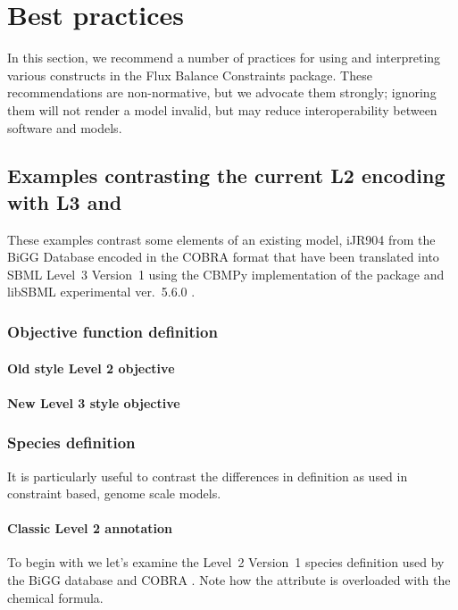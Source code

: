 
\section{Best practices}
\label{best-practices}

In this section, we recommend a number of practices for using and
interpreting various constructs in the Flux Balance Constraints package.
These recommendations are non-normative, but we advocate them strongly;
ignoring them will not render a model invalid, but may reduce
interoperability between software and models.

\subsection{Examples contrasting the current \SBML L2 encoding with L3 and \FBC}
These examples contrast some elements of an existing model, iJR904 from the \textsf{BiGG} Database encoded in the \textsf{COBRA} format \cite{ijr904, bigg, cobra} that have been translated into SBML Level~3 Version~1 using the \textsf{CBMPy} implementation of the \FBC package \cite{pysces, cbmpy} and \textsf{libSBML} experimental ver.~5.6.0 \cite{libsbml}.

\subsubsection*{Objective function definition}
\paragraph{Old style \SBML Level 2 objective}

\paragraph{New \SBML Level 3 style objective}
\protect{}

\newpage
\subsubsection*{Species definition}
It is particularly useful to contrast the differences in \Species definition as used in constraint based, genome scale models.

\paragraph{Classic \SBML Level 2 \Species annotation}
To begin with we let's examine the \SBML Level~2 Version~1 species definition used by the BiGG database and \textsf{COBRA} \cite{bigg, cobra}. Note how the  attribute is overloaded with the chemical formula.
%

